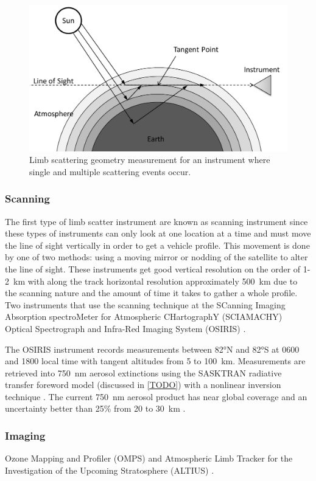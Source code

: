 \begin{figure}[h!]
    \includegraphics[width=1.0\textwidth]{./Images/2-2-LimbScatterGeometry.pdf}
    \caption[Limb Scatter Geometry]{Limb scattering geometry measurement for an instrument where single and multiple scattering events occur.}
    \label{fig:2.2:LimbScatterGeometry}
\end{figure}

\subsubsection{Scanning}

The first type of limb scatter instrument are known as scanning instrument since these types of instruments can only look at one location at a time and must move the line of sight vertically in order to get a vehicle profile. This movement is done by one of two methods: using a moving mirror or nodding of the satellite to alter the line of sight. These instruments get good vertical resolution on the order of 1-2~km with along the track horizontal resolution approximately 500~km due to the scanning nature and the amount of time it takes to gather a whole profile. Two instruments that use the scanning technique at the SCanning Imaging Absorption spectroMeter for Atmospheric CHartographY (SCIAMACHY) \citep{Bovensmann1999} Optical Spectrograph and Infra-Red Imaging System (OSIRIS) \citep{Llewellyn2004}.

The OSIRIS instrument records measurements between 82\si{\degree}N and 82\si{\degree}S at 0600 and 1800 local time with tangent altitudes from 5 to 100~km. Measurements are retrieved into 750~nm aerosol extinctions using the SASKTRAN radiative transfer foreword model (discussed in \autoref{TODO}) with a nonlinear inversion technique \citep{Bourassa2007}. The current 750~nm aerosol product has near global coverage and an uncertainty better than 25\% from 20 to 30~km \citep{Bourassa2012a,Bourassa2012b}.

\subsubsection{Imaging}

Ozone Mapping and Profiler (OMPS) \citep{Dittman2002} and Atmospheric Limb Tracker for the Investigation of the Upcoming Stratosphere (ALTIUS) \citep{Dekemper2014}. 